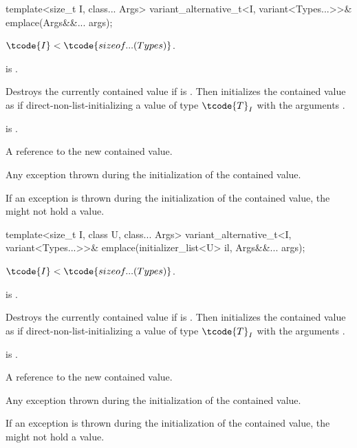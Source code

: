 %
\begin{itemdecl}
template<size_t I, class... Args>
  variant_alternative_t<I, variant<Types...>>& emplace(Args&&... args);
\end{itemdecl}

\begin{itemdescr}
\pnum
\mandates
$\tcode{I} < \tcode{sizeof...(Types)}$.

\pnum
\constraints
{} is .

\pnum
\effects
Destroys the currently contained value if 
is .
Then initializes the contained value as if direct-non-list-initializing
a value of type $\tcode{T}_I$
with the arguments .

\pnum
\ensures
{} is .

\pnum
\returns
A reference to the new contained value.

\pnum
\throws
Any exception thrown during the initialization of the contained value.

\pnum
\remarks
If an exception is thrown during the initialization of the contained value,
the  might not hold a value.
\end{itemdescr}

%
\begin{itemdecl}
template<size_t I, class U, class... Args>
  variant_alternative_t<I, variant<Types...>>& emplace(initializer_list<U> il, Args&&... args);
\end{itemdecl}

\begin{itemdescr}
\pnum
\mandates
$\tcode{I} < \tcode{sizeof...(Types)}$.

\pnum
\constraints
{} is .

\pnum
\effects
Destroys the currently contained value if 
is .
Then initializes the contained value as if direct-non-list-initializing
a value of type $\tcode{T}_I$
with the arguments .

\pnum
\ensures
{} is .

\pnum
\returns
A reference to the new contained value.

\pnum
\throws
Any exception thrown during the initialization of the contained value.

\pnum
\remarks
If an exception is thrown during the initialization of the contained value,
the  might not hold a value.
\end{itemdescr}

